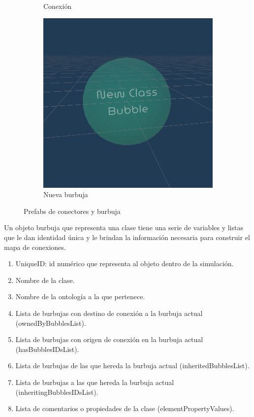 \begin{figure}[ht]
\begin{subfigure}{0.3\textwidth}
       \caption{Conexión}
   \end{subfigure}
   \hfill
   \begin{subfigure}{0.3\textwidth}
       \centering
       \includegraphics[height=\textwidth]{chapter2/figures/newbubble.png}
       \caption{Nueva burbuja}
   \end{subfigure}
   \caption{Prefabs de conectores y burbuja}
\end{figure}

Un objeto burbuja que representa una clase tiene una serie de variables y listas que le dan identidad única y le brindan la información necesaria para construir el mapa de conexiones.

\begin{enumerate}
   \item UniqueID: id numérico que representa al objeto dentro de la simulación.
   \item Nombre de la clase.
   \item Nombre de la ontología a la que pertenece.
   \item Lista de burbujas con destino de conexión a la burbuja actual (ownedByBubblesList).
   \item Lista de burbujas con origen de conexión en la burbuja actual (hasBubblesIDsList).
   \item Lista de burbujas de las que hereda la burbuja actual (inheritedBubblesList).
   \item Lista de burbujas a las que hereda la burbuja actual (inheritingBubblesIDsList).
   \item Lista de comentarios o propiedades de la clase (elementPropertyValues).
\end{enumerate}

